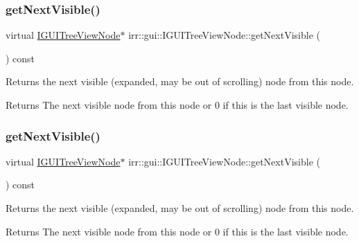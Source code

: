 \subsubsection{\texorpdfstring{get\+Next\+Visible()}{getNextVisible()}\hspace{0.1cm}{\footnotesize\ttfamily [1/2]}}
{\footnotesize\ttfamily virtual \hyperlink{classirr_1_1gui_1_1IGUITreeViewNode}{I\+G\+U\+I\+Tree\+View\+Node}$\ast$ irr\+::gui\+::\+I\+G\+U\+I\+Tree\+View\+Node\+::get\+Next\+Visible (\begin{DoxyParamCaption}{ }\end{DoxyParamCaption}) const\hspace{0.3cm}{\ttfamily [pure virtual]}}



Returns the next visible (expanded, may be out of scrolling) node from this node. 

\begin{DoxyReturn}{Returns}
The next visible node from this node or 0 if this is the last visible node. 
\end{DoxyReturn}
\mbox{\label{classirr_1_1gui_1_1IGUITreeViewNode_add12cd0ee7b12a49c0f140741f9449fb}} 
\subsubsection{\texorpdfstring{get\+Next\+Visible()}{getNextVisible()}\hspace{0.1cm}{\footnotesize\ttfamily [2/2]}}
{\footnotesize\ttfamily virtual \hyperlink{classirr_1_1gui_1_1IGUITreeViewNode}{I\+G\+U\+I\+Tree\+View\+Node}$\ast$ irr\+::gui\+::\+I\+G\+U\+I\+Tree\+View\+Node\+::get\+Next\+Visible (\begin{DoxyParamCaption}{ }\end{DoxyParamCaption}) const\hspace{0.3cm}{\ttfamily [pure virtual]}}



Returns the next visible (expanded, may be out of scrolling) node from this node. 

\begin{DoxyReturn}{Returns}
The next visible node from this node or 0 if this is the last visible node. 
\end{DoxyReturn}
\mbox{\label{classirr_1_1gui_1_1IGUITreeViewNode_a37d30138ae01528cb1213324c511d079}} 
